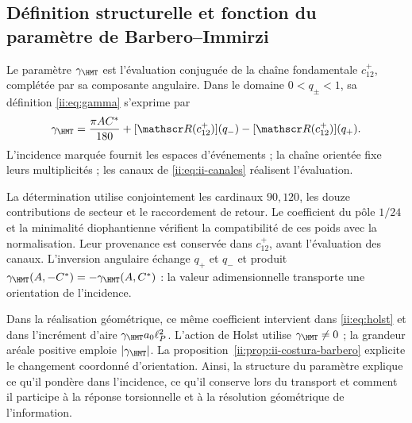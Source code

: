 \subsection{Définition structurelle et fonction du paramètre de Barbero--Immirzi}
\label{ii:sec:ii-definicion-barbero}

\begin{definition}
Le paramètre \(\gamma_{\HMT}\) est l'évaluation conjuguée de la
chaîne fondamentale \(c_{12}^{+}\), complétée par sa composante
angulaire. Dans le domaine \(0<q_\pm<1\), sa définition
\eqref{ii:eq:gamma} s'exprime par
\begin{equation}
 \gamma_{\HMT}
 =\frac{\pi AC^*}{180}
  +[\mathscr R(c_{12}^{+})](q_-)
  -[\mathscr R(c_{12}^{+})](q_+).
 \label{ii:eq:ii-definicion-barbero-evaluacion}
\end{equation}
L'incidence marquée fournit les espaces d'événements ; la chaîne
orientée fixe leurs multiplicités ; les canaux de
\eqref{ii:eq:ii-canales} réalisent l'évaluation.
\end{definition}

La détermination utilise conjointement les cardinaux \(90,120\),
les douze contributions de secteur et le raccordement de retour. Le
coefficient du pôle \(1/24\) et la minimalité diophantienne vérifient
la compatibilité de ces poids avec la normalisation. Leur provenance
est conservée dans \(c_{12}^{+}\), avant l'évaluation des canaux. L'inversion
angulaire échange \(q_+\) et \(q_-\) et produit
\(\gamma_{\HMT}(A,-C^*)=-\gamma_{\HMT}(A,C^*)\) : la valeur
adimensionnelle transporte une orientation de l'incidence.

Dans la réalisation géométrique, ce même coefficient intervient dans
\eqref{ii:eq:holst} et dans l'incrément d'aire
\(\gamma_{\HMT}a_0\ell_P^2\). L'action de Holst utilise
\(\gamma_{\HMT}\ne0\) ; la grandeur aréale positive emploie
\(|\gamma_{\HMT}|\). La proposition~\ref{ii:prop:ii-costura-barbero}
explicite le changement coordonné d'orientation. Ainsi, la structure
du paramètre explique ce qu'il pondère dans l'incidence, ce qu'il conserve
lors du transport et comment il participe à la réponse torsionnelle et à
la résolution géométrique de l'information.
